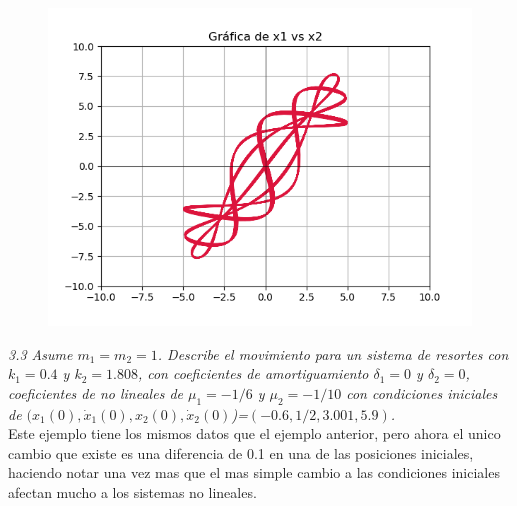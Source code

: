 \documentclass[12pt]{article}
\begin{document}
\begin{figure}[h!]
    \centering
\includegraphics[width=5in]{Ej3_23.png}
\end{figure}

\pagebreak 

\noindent \textit{3.3 Asume $m_1 = m_2 = 1$. Describe el movimiento para un sistema de resortes con $k_1=0.4$ y $k_2=1.808$, con coeficientes de amortiguamiento $\delta_1=0$ y $\delta_2=0$, coeficientes de no lineales de $\mu_1=-1/6$ y $\mu_2=-1/10$ con condiciones iniciales de $(x_1(0), \dot x_1(0), x_2(0), \dot x_2(0)$)=$(-0.6,1/2,3.001,5.9)$.}\\

Este ejemplo tiene los mismos datos que el ejemplo anterior, pero ahora el unico cambio que existe es una diferencia de 0.1 en una de las posiciones iniciales, haciendo notar una vez mas que el mas simple cambio a las condiciones iniciales afectan mucho a los sistemas no lineales.
\end{document}

